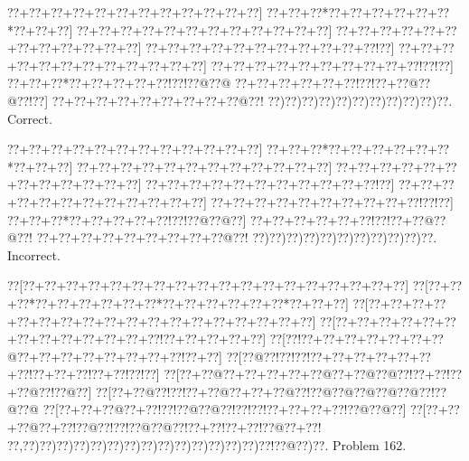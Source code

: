 \documentclass[a5paper]{article}
\begin{document}
\begin{center}
{\goo
\0??+\0??+\0??+\0??+\0??+\0??+\0??+\0??+\0??+\0??+\0??+\0??]
\0??+\0??+\0??*\0??+\0??+\0??+\0??+\0??+\0??*\0??+\0??+\0??]
\0??+\0??+\0??+\0??+\0??+\0??+\0??+\0??+\0??+\0??+\0??+\0??]
\0??+\0??+\0??+\0??+\0??+\0??+\0??+\0??+\0??+\0??+\0??+\0??]
\0??+\0??+\0??+\0??+\0??+\0??+\0??+\0??+\0??+\0??+\0??!\0??]
\0??+\0??+\0??+\0??+\0??+\0??+\0??+\0??+\0??+\0??+\0??+\0??]
\0??+\0??+\0??+\0??+\0??+\0??+\0??+\0??+\0??+\0??!\0??!\0??]
\0??+\0??+\0??*\0??+\0??+\0??+\0??+\0??!\0??!\0??@\0??@
\0??+\0??+\0??+\0??+\0??+\0??!\0??!\0??+\0??@\0??@\0??!\0??]
\0??+\0??+\0??+\0??+\0??+\0??+\0??+\0??+\0??@\0??!
\0??)\0??)\0??)\0??)\0??)\0??)\0??)\0??)\0??)\0??)\0??.
}
Correct. 

\end{center}
\begin{center}
{\goo
\0??+\0??+\0??+\0??+\0??+\0??+\0??+\0??+\0??+\0??+\0??+\0??]
\0??+\0??+\0??*\0??+\0??+\0??+\0??+\0??+\0??*\0??+\0??+\0??]
\0??+\0??+\0??+\0??+\0??+\0??+\0??+\0??+\0??+\0??+\0??+\0??]
\0??+\0??+\0??+\0??+\0??+\0??+\0??+\0??+\0??+\0??+\0??+\0??]
\0??+\0??+\0??+\0??+\0??+\0??+\0??+\0??+\0??+\0??+\0??!\0??]
\0??+\0??+\0??+\0??+\0??+\0??+\0??+\0??+\0??+\0??+\0??+\0??]
\0??+\0??+\0??+\0??+\0??+\0??+\0??+\0??+\0??+\0??!\0??!\0??]
\0??+\0??+\0??*\0??+\0??+\0??+\0??+\0??!\0??!\0??@\0??@\0??]
\0??+\0??+\0??+\0??+\0??+\0??!\0??!\0??+\0??@\0??@\0??!
\0??+\0??+\0??+\0??+\0??+\0??+\0??+\0??+\0??@\0??!
\0??)\0??)\0??)\0??)\0??)\0??)\0??)\0??)\0??)\0??)\0??.
}
Incorrect. 

\end{center}
\newpage
\begin{center}
{\goo
\0??[\0??+\0??+\0??+\0??+\0??+\0??+\0??+\0??+\0??+\0??+\0??+\0??+\0??+\0??+\0??+\0??+\0??+\0??]
\0??[\0??+\0??+\0??*\0??+\0??+\0??+\0??+\0??+\0??*\0??+\0??+\0??+\0??+\0??+\0??*\0??+\0??+\0??]
\0??[\0??+\0??+\0??+\0??+\0??+\0??+\0??+\0??+\0??+\0??+\0??+\0??+\0??+\0??+\0??+\0??+\0??+\0??]
\0??[\0??+\0??+\0??+\0??+\0??+\0??+\0??+\0??+\0??+\0??+\0??+\0??+\0??!\0??+\0??+\0??+\0??+\0??]
\0??[\0??!\0??+\0??+\0??+\0??+\0??+\0??+\0??@\0??+\0??+\0??+\0??+\0??+\0??+\0??+\0??!\0??+\0??]
\0??[\0??@\0??!\0??!\0??!\0??+\0??+\0??+\0??+\0??+\0??+\0??!\0??+\0??+\0??!\0??+\0??!\0??!\0??]
\0??[\0??+\0??@\0??+\0??+\0??+\0??+\0??@\0??+\0??@\0??@\0??!\0??+\0??!\0??+\0??@\0??!\0??@\0??]
\0??[\0??+\0??@\0??!\0??!\0??+\0??@\0??+\0??+\0??@\0??!\0??@\0??@\0??@\0??@\0??@\0??!\0??@\0??@
\0??[\0??+\0??+\0??@\0??+\0??!\0??!\0??@\0??@\0??!\0??!\0??!\0??+\0??+\0??+\0??!\0??@\0??@\0??]
\0??[\0??+\0??+\0??@\0??+\0??!\0??@\0??!\0??!\0??@\0??@\0??!\0??+\0??!\0??+\0??!\0??@\0??+\0??!
\0??,\0??)\0??)\0??)\0??)\0??)\0??)\0??)\0??)\0??)\0??)\0??)\0??)\0??)\0??)\0??!\0??@\0??)\0??.
}
Problem 162.

\end{center}
\end{document}
